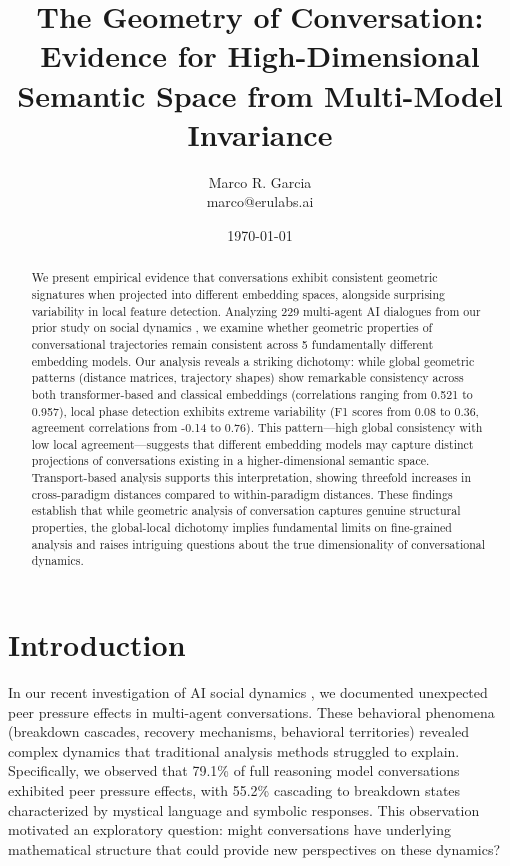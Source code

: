 \documentclass[11pt,letterpaper]{article}
\title{The Geometry of Conversation: Evidence for High-Dimensional Semantic Space from Multi-Model Invariance}
\author{
Marco R. Garcia \\
marco@erulabs.ai
}
\date{\today}
\newcommand{\totalConversations}{229}
\newcommand{\numEmbeddingModels}{5}
\newcommand{\minPairwiseCorr}{0.521}
\newcommand{\maxPairwiseCorr}{0.957}
\begin{document}
\maketitle

\begin{abstract}
We present empirical evidence that conversations exhibit consistent geometric signatures when projected into different embedding spaces, alongside surprising variability in local feature detection. Analyzing \totalConversations{} multi-agent AI dialogues from our prior study on social dynamics \citep{garcia2025peer}, we examine whether geometric properties of conversational trajectories remain consistent across \numEmbeddingModels{} fundamentally different embedding models. Our analysis reveals a striking dichotomy: while global geometric patterns (distance matrices, trajectory shapes) show remarkable consistency across both transformer-based and classical embeddings (correlations ranging from \minPairwiseCorr{} to \maxPairwiseCorr{}), local phase detection exhibits extreme variability (F1 scores from 0.08 to 0.36, agreement correlations from -0.14 to 0.76). This pattern—high global consistency with low local agreement—suggests that different embedding models may capture distinct projections of conversations existing in a higher-dimensional semantic space. Transport-based analysis supports this interpretation, showing threefold increases in cross-paradigm distances compared to within-paradigm distances. These findings establish that while geometric analysis of conversation captures genuine structural properties, the global-local dichotomy implies fundamental limits on fine-grained analysis and raises intriguing questions about the true dimensionality of conversational dynamics.
\end{abstract}

\section{Introduction}

In our recent investigation of AI social dynamics \citep{garcia2025peer}, we documented unexpected peer pressure effects in multi-agent conversations. These behavioral phenomena (breakdown cascades, recovery mechanisms, behavioral territories) revealed complex dynamics that traditional analysis methods struggled to explain. Specifically, we observed that 79.1\% of full reasoning model conversations exhibited peer pressure effects, with 55.2\% cascading to breakdown states characterized by mystical language and symbolic responses. This observation motivated an exploratory question: might conversations have underlying mathematical structure that could provide new perspectives on these dynamics?
\end{document}
